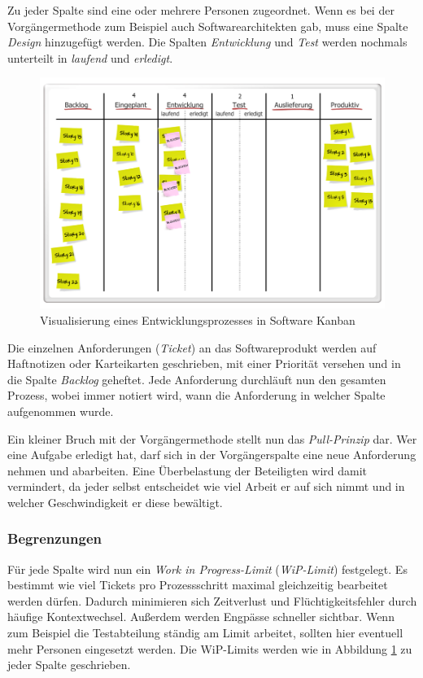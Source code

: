 Zu jeder Spalte sind eine oder mehrere Personen zugeordnet. Wenn es bei der Vorgängermethode zum Beispiel auch Softwarearchitekten gab, muss eine Spalte \emph{Design} hinzugefügt werden. Die Spalten \emph{Entwicklung} und \emph{Test} werden nochmals unterteilt in \emph{laufend} und \emph{erledigt}. 

\begin{figure}[h]
  \centering
  \includegraphics[width=1\textwidth]{images/kanbanBoard}
  \caption{Visualisierung eines Entwicklungsprozesses in Software Kanban \cite{bib:roock}}
  \label{fig:kanbanBoard}
\end{figure}

Die einzelnen Anforderungen (\emph{Ticket}) an das Softwareprodukt werden auf Haftnotizen oder Karteikarten geschrieben, mit einer Priorität versehen und in die Spalte \emph{Backlog} geheftet. Jede Anforderung durchläuft nun den gesamten Prozess, wobei immer notiert wird, wann die Anforderung in welcher Spalte aufgenommen wurde.

Ein kleiner Bruch mit der Vorgängermethode stellt nun das \emph{Pull-Prinzip} dar. Wer eine Aufgabe erledigt hat, darf sich in der Vorgängerspalte eine neue Anforderung nehmen und abarbeiten. Eine Überbelastung der Beteiligten wird damit vermindert, da jeder selbst entscheidet wie viel Arbeit er auf sich nimmt und in welcher Geschwindigkeit er diese bewältigt.

\subsubsection{Begrenzungen}
Für jede Spalte wird nun ein \emph{Work in Progress-Limit} (\emph{WiP-Limit}) festgelegt. Es bestimmt wie viel Tickets pro Prozessschritt maximal gleichzeitig bearbeitet werden dürfen. Dadurch minimieren sich Zeitverlust und Flüchtigkeitsfehler durch häufige Kontextwechsel. Außerdem werden Engpässe schneller sichtbar. Wenn zum Beispiel die Testabteilung ständig am Limit arbeitet, sollten hier eventuell mehr Personen eingesetzt werden.
Die WiP-Limits werden wie in Abbildung \ref{fig:kanbanBoard} zu jeder Spalte geschrieben.

